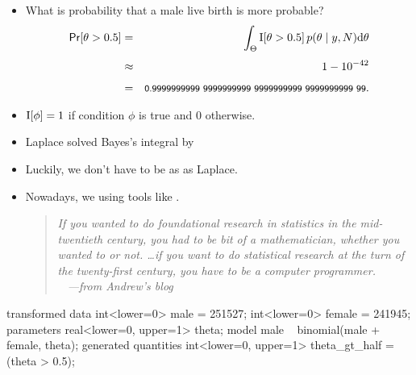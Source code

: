 \documentclass[10pt]{report}
\begin{document}
%
\begin{itemize}
\item What is probability that a male live birth is more probable?
\begin{eqnarray*}
\text{\sf Pr}[\theta > 0.5]
& = &  \int_{\Theta} \text{I}[\theta > 0.5] \, p(\theta \mid y,N) \textrm{d}\theta
\\[4pt]
  & \approx &  1 - 10^{-42}
  \\[4pt]
  & = & \textsf{\footnotesize 0.9999999999 9999999999 9999999999 9999999999 99}.
\end{eqnarray*}
\item $\text{I}[\phi] = 1$ if condition $\phi$ is true and 0 otherwise. 
\item  Laplace solved Bayes's integral by
\end{itemize}


%
\begin{itemize}
\item Luckily, we don't have to be as  as Laplace.
\item Nowadays, we  using 
  tools like . 
\vfill 
\begin{quote}\slshape 
  If you wanted to do foundational research in statistics in the 
  mid-twentieth century, you had to be bit of a mathematician, whether 
  you wanted to or not. \ldots if you want to do statistical research 
  at the turn of the twenty-first century, you have to be a computer 
  programmer.  \\[3pt] \mbox{ } \hfill {\small ---from Andrew's blog}
\end{quote}
\end{itemize}

%
\begin{stancode}
transformed data {
  int<lower=0> male = 251527;
  int<lower=0> female = 241945;
}
parameters {
  real<lower=0, upper=1> theta;
}
model {
  male ~ binomial(male + female, theta);
}
generated quantities {
  int<lower=0, upper=1> theta_gt_half = (theta > 0.5);
}
\end{stancode}
\end{document}
